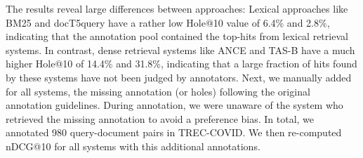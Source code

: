 \documentclass{article}
\begin{document}
\begin{table*}[t!]
    \small
    \caption{Hole@10 analysis on TREC-COVID. Annotated scores show improvement in performances after removing holes@10 (documents in top-10 hits unseen by annotators) across each model. \vspace{-3mm}}
    \label{tab:hole@k}
\end{table*}

The results reveal large differences between approaches: Lexical approaches like BM25 and docT5query have a rather low Hole@10 value of 6.4\% and 2.8\%, indicating that the annotation pool contained the top-hits from lexical retrieval systems. In contrast, dense retrieval systems like ANCE and TAS-B have a much higher Hole@10 of 14.4\% and 31.8\%, indicating that a large fraction of hits found by these systems have not been judged by annotators.
Next, we manually added for all systems, the missing annotation (or holes) following the original annotation guidelines. During annotation, we were unaware of the system who retrieved the missing annotation to avoid a preference bias. In total, we annotated 980 query-document pairs in TREC-COVID. We then re-computed nDCG@10 for all systems with this additional annotations.
\end{document}

